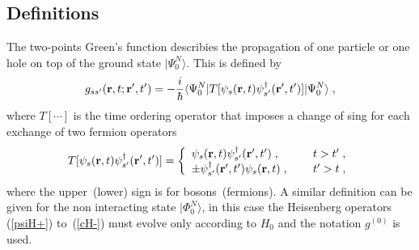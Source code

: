 \subsection{Definitions}

The two-points Green's function describies the propagation of one particle or one hole on top of the ground state $\vert\Psi^N_0\rangle$. This is defined by
\begin{equation}
g_{s s'}({\bf r}, t; {\bf r}', t') = -\frac{i}{\hbar} 
\langle \Psi^N_0 \vert T [\psi_s({\bf r}, t) \psi^\dag_{s'}({\bf r}', t')  ] \vert \Psi^N_0 \rangle \; ,
\label{grr1tt_def}
\end{equation}
where $T[\cdots]$ is the time ordering operator that imposes a change of sing for each exchange of two fermion operators
\begin{equation}
T [\psi_s({\bf r}, t) \psi^\dag_{s'}({\bf r}', t')] =
\left\{
 \begin{array}{lll}
      \psi_s({\bf r}, t) \psi^\dag_{s'}({\bf r}', t') \; , &    & t > t' \; ,\\
  \pm \psi^\dag_{s'}({\bf r}', t') \psi_s({\bf r}, t) \; , & ~  & t' > t \; ,
 \end{array}
\right.
\end{equation}
where the upper~(lower) sign is for bosons~(fermions).
%
A similar definition can be given for the non interacting state $\vert\Phi^N_0\rangle$, in this case the Heisenberg operators (\ref{psiH+}) to~(\ref{cH-}) must evolve only according to $H_0$ and the notation $g^{(0)}$ is used.



